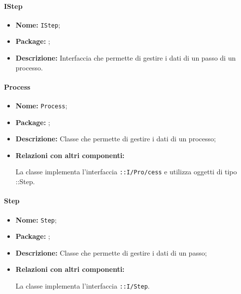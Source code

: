 \paragraph{IStep}
\begin{itemize}
\item \textbf{Nome:} \texttt{IStep};
\item \textbf{Package:} \texttt{\model{}};
\item \textbf{Descrizione:} Interfaccia che permette di gestire i dati di un passo di un processo.
\end{itemize}

\paragraph{Process}
\begin{flushleft}
\begin{itemize}
\item \textbf{Nome:} \texttt{Process};
\item \textbf{Package:} \texttt{\model{}};
\item \textbf{Descrizione:} Classe che permette di gestire i dati di un processo;
\item \textbf{Relazioni con altri componenti:}
\begin{sloppypar}
La classe implementa l'interfaccia \texttt{\model{}::I\fshyp{}Pro\fshyp{}cess} e utilizza oggetti di tipo \texttt{\model{}}::Step.
\end{sloppypar}
\end{itemize}
\end{flushleft}

\paragraph{Step}
\begin{flushleft}
\begin{itemize}
\item \textbf{Nome:} \texttt{Step};
\item \textbf{Package:} \texttt{\model{}};
\item \textbf{Descrizione:} Classe che permette di gestire i dati di un passo;
\item \textbf{Relazioni con altri componenti:}
\begin{sloppypar}
La classe implementa l'interfaccia \texttt{\model{}::I\fshyp{}Step}.
\end{sloppypar}
\end{itemize}
\end{flushleft}

